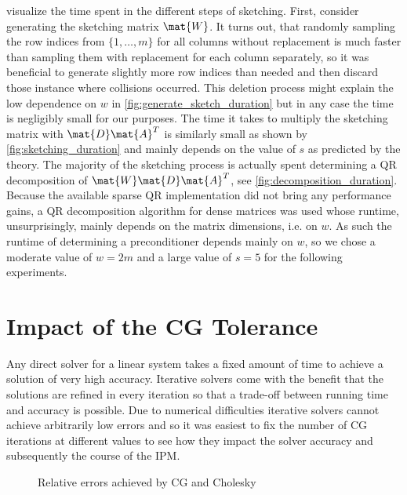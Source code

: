  visualize the time spent in the different steps of sketching.
First, consider generating the sketching matrix \(\mat{W}\).
It turns out, that randomly sampling the row indices from \(\{1, \ldots, m\}\) for all columns without replacement is much faster than sampling them with replacement for each column separately, so it was beneficial to generate slightly more row indices than needed and then discard those instance where collisions occurred.
This deletion process might explain the low dependence on \(w\) in \cref{fig:generate_sketch_duration} but in any case the time is negligibly small for our purposes.
The time it takes to multiply the sketching matrix with \(\mat{D}\mat{A}^T\) is similarly small as shown by \cref{fig:sketching_duration} and mainly depends on the value of \(s\) as predicted by the theory.
The majority of the sketching process is actually spent determining a QR decomposition of \(\mat{W}\mat{D}\mat{A}^T\), see \cref{fig:decomposition_duration}.
Because the available sparse QR implementation did not bring any performance gains, a QR decomposition algorithm for dense matrices was used whose runtime, unsurprisingly, mainly depends on the matrix dimensions, i.e. on \(w\).
As such the runtime of determining a preconditioner depends mainly on \(w\), so we chose a moderate value of \(w=2m\) and a large value of \(s=5\) for the following experiments.

\section{Impact of the CG Tolerance}

Any direct solver for a linear system takes a fixed amount of time to achieve a solution of very high accuracy.
Iterative solvers come with the benefit that the solutions are refined in every iteration so that a trade-off between running time and accuracy is possible.
Due to numerical difficulties iterative solvers cannot achieve arbitrarily low errors and so it was easiest to fix the number of CG iterations at different values to see how they impact the solver accuracy and subsequently the course of the IPM.

\begin{figure}[tbp]
  \centering%
  \caption{Relative errors achieved by CG and Cholesky}%
  \label{fig:residual_norms}
\end{figure}

